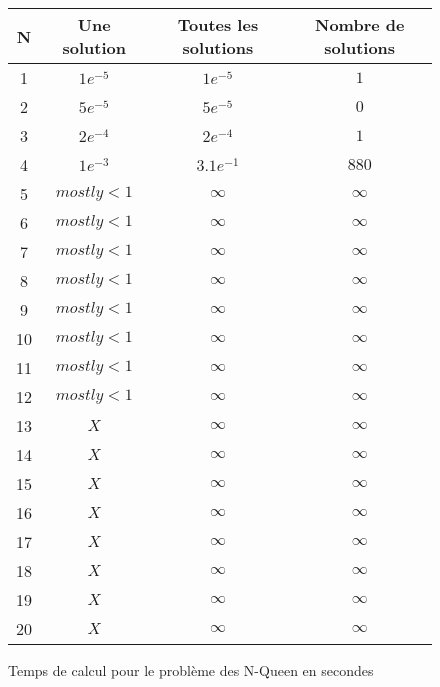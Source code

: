 \begin{figure}[!h]
    \begin{center}
        \begin{tabular}{|c|c|c|c|}
            \hline
            \textbf{N} & \textbf{Une solution} & \textbf{Toutes les solutions} & \textbf{Nombre de solutions} \\ \hline
            1 & $1e^{-5}$ & $1e^{-5}$ & $1$ \\ \hline
            2 & $5e^{-5}$ & $5e^{-5}$ & $0$ \\ \hline
            3 & $2e^{-4}$ & $2e^{-4}$ & $1$ \\ \hline
            4 & $1e^{-3}$ & $3.1e^{-1}$ & $880$ \\ \hline
            5 & $mostly<1$ & $\infty$ & $\infty$ \\ \hline
            6 & $mostly<1$ & $\infty$ & $\infty$ \\ \hline
            7 & $mostly<1$ & $\infty$ & $\infty$ \\ \hline
            8 & $mostly<1$ & $\infty$ & $\infty$ \\ \hline
            9 & $mostly<1$ & $\infty$ & $\infty$ \\ \hline
            10 & $mostly<1$ & $\infty$ & $\infty$ \\ \hline
            11 & $mostly<1$ & $\infty$ & $\infty$ \\ \hline
            12 & $mostly<1$ & $\infty$ & $\infty$ \\ \hline
            13 & $X$ & $\infty$ & $\infty$ \\ \hline
            14 & $X$ & $\infty$ & $\infty$ \\ \hline
            15 & $X$ & $\infty$ & $\infty$ \\ \hline
            16 & $X$ & $\infty$ & $\infty$ \\ \hline
            17 & $X$ & $\infty$ & $\infty$ \\ \hline
            18 & $X$ & $\infty$ & $\infty$ \\ \hline
            19 & $X$ & $\infty$ & $\infty$ \\ \hline
            20 & $X$ & $\infty$ & $\infty$ \\ \hline
        \end{tabular}
        \caption{Temps de calcul pour le problème des N-Queen en secondes}
        \label{Tab-Temps-Magic-Square}
    \end{center}
\end{figure}

